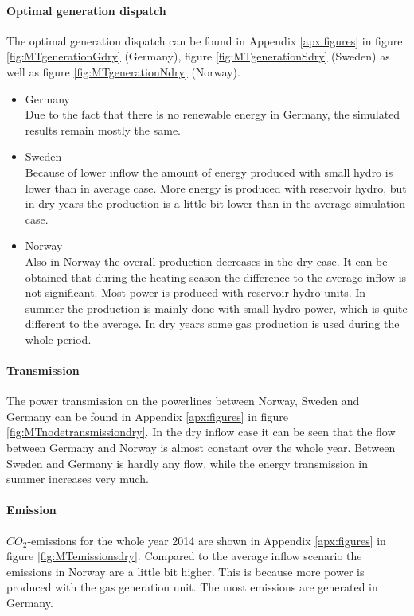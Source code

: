 \documentclass{article}
\begin{document}
\paragraph{Optimal generation dispatch\\}
The optimal generation dispatch can be found in Appendix \ref{apx:figures} in figure \ref{fig:MTgenerationGdry} (Germany), figure \ref{fig:MTgenerationSdry} (Sweden) as well as figure \ref{fig:MTgenerationNdry} (Norway).
\begin{itemize}
\item Germany\\
Due to the fact that there is no renewable energy in Germany, the simulated results remain mostly the same. 
\item Sweden\\
Because of lower inflow the amount of energy produced with small hydro is lower than in average case. More energy is produced with reservoir hydro, but in dry years the production is a little bit lower than in the average simulation case.
\item Norway\\
Also in Norway the overall production decreases in the dry case. It can be obtained that during the heating season the difference to the average inflow is not significant. Most power is produced with reservoir hydro units. In summer the production is mainly done with small hydro power, which is quite different to the average. In dry years some gas production is used during the whole period.
\end{itemize}

\paragraph{Transmission\\}
The power transmission on the powerlines between Norway, Sweden and Germany can be found in Appendix \ref{apx:figures} in  figure \ref{fig:MTnodetransmissiondry}. In the dry inflow case it can be seen that the flow between Germany and Norway is almost constant over the whole year. Between Sweden and Germany is hardly any flow, while the energy transmission in summer increases very much.

\paragraph{Emission\\}
$CO_2$-emissions for the whole year 2014 are shown in Appendix \ref{apx:figures} in figure \ref{fig:MTemissionsdry}. Compared to the average inflow scenario the emissions in Norway are a little bit higher. This is because more power is produced with the gas generation unit. The most emissions are generated in Germany.
\end{document}
